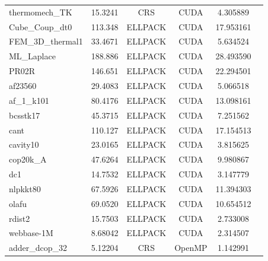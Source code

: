 \documentclass[12pt,oneside]{book} %
\begin{document}
\begin{longtable}{lccccr}
    thermomech\_TK    & 15.3241                   & CRS                     & CUDA                 & 4.305889         \\
    Cube\_Coup\_dt0   & 113.348                   & ELLPACK                 & CUDA                 & 17.953161        \\
    FEM\_3D\_thermal1 & 33.4671                   & ELLPACK                 & CUDA                 & 5.634524         \\
    ML\_Laplace       & 188.886                   & ELLPACK                 & CUDA                 & 28.493590        \\
    PR02R             & 146.651                   & ELLPACK                 & CUDA                 & 22.294501        \\
    af23560           & 29.4083                   & ELLPACK                 & CUDA                 & 5.066518         \\
    af\_1\_k101       & 80.4176                   & ELLPACK                 & CUDA                 & 13.098161        \\
    bcsstk17          & 45.3715                   & ELLPACK                 & CUDA                 & 7.251562         \\
    cant              & 110.127                   & ELLPACK                 & CUDA                 & 17.154513        \\
    cavity10          & 23.0165                   & ELLPACK                 & CUDA                 & 3.815625         \\
    cop20k\_A         & 47.6264                   & ELLPACK                 & CUDA                 & 9.980867         \\
    dc1               & 14.7532                   & ELLPACK                 & CUDA                 & 3.147779         \\
    nlpkkt80          & 67.5926                   & ELLPACK                 & CUDA                 & 11.394303        \\
    olafu             & 69.0520                   & ELLPACK                 & CUDA                 & 10.654512        \\
    rdist2            & 15.7503                   & ELLPACK                 & CUDA                 & 2.733008         \\
    webbase-1M        & 8.68042                   & ELLPACK                 & CUDA                 & 2.314507         \\
    adder\_dcop\_32   & 5.12204                   & CRS                     & OpenMP               & 1.142991         \\

\end{longtable}
\end{document}

